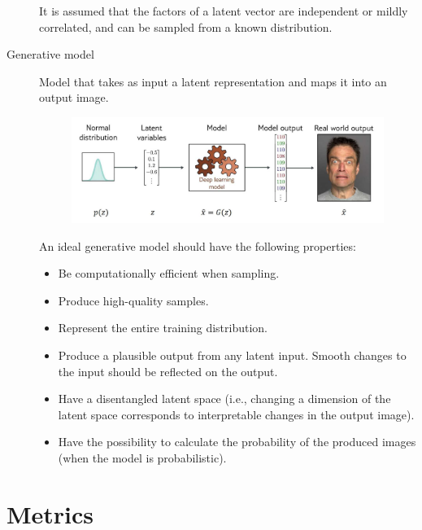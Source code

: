 \begin{description}
        It is assumed that the factors of a latent vector are independent or mildly correlated, and can be sampled from a known distribution.

    \item[Generative model] 
        Model that takes as input a latent representation and maps it into an output image.
        \begin{figure}[H]
            \centering
            \includegraphics[width=0.7\linewidth]{./img/latent_for_generation.jpg}
        \end{figure}

        \begin{remark}
            An ideal generative model should have the following properties:
            \begin{itemize}
                \item Be computationally efficient when sampling.
                \item Produce high-quality samples.
                \item Represent the entire training distribution.
                \item Produce a plausible output from any latent input. Smooth changes to the input should be reflected on the output.
                \item Have a disentangled latent space (i.e., changing a dimension of the latent space corresponds to interpretable changes in the output image).
                \item Have the possibility to calculate the probability of the produced images (when the model is probabilistic). 
            \end{itemize}
        \end{remark}
\end{description}



\section{Metrics}

